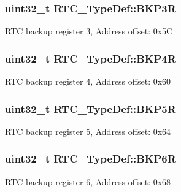 \subsubsection[{\texorpdfstring{B\+K\+P3R}{BKP3R}}]{ uint32\+\_\+t R\+T\+C\+\_\+\+Type\+Def\+::\+B\+K\+P3R}\hypertarget{struct_r_t_c___type_def_ac3802c3b17482a0667fb34ddd1863434}{}\label{struct_r_t_c___type_def_ac3802c3b17482a0667fb34ddd1863434}
R\+TC backup register 3, Address offset\+: 0x5C 
\subsubsection[{\texorpdfstring{B\+K\+P4R}{BKP4R}}]{ uint32\+\_\+t R\+T\+C\+\_\+\+Type\+Def\+::\+B\+K\+P4R}\hypertarget{struct_r_t_c___type_def_a6131b2f2896c122cf223206e4cfd2bd0}{}\label{struct_r_t_c___type_def_a6131b2f2896c122cf223206e4cfd2bd0}
R\+TC backup register 4, Address offset\+: 0x60 
\subsubsection[{\texorpdfstring{B\+K\+P5R}{BKP5R}}]{ uint32\+\_\+t R\+T\+C\+\_\+\+Type\+Def\+::\+B\+K\+P5R}\hypertarget{struct_r_t_c___type_def_a0f3a33de81247ec5729e400a1261f917}{}\label{struct_r_t_c___type_def_a0f3a33de81247ec5729e400a1261f917}
R\+TC backup register 5, Address offset\+: 0x64 
\subsubsection[{\texorpdfstring{B\+K\+P6R}{BKP6R}}]{ uint32\+\_\+t R\+T\+C\+\_\+\+Type\+Def\+::\+B\+K\+P6R}\hypertarget{struct_r_t_c___type_def_a766e2071c5826e3a299ae1cd5bbf06f7}{}\label{struct_r_t_c___type_def_a766e2071c5826e3a299ae1cd5bbf06f7}
R\+TC backup register 6, Address offset\+: 0x68 
